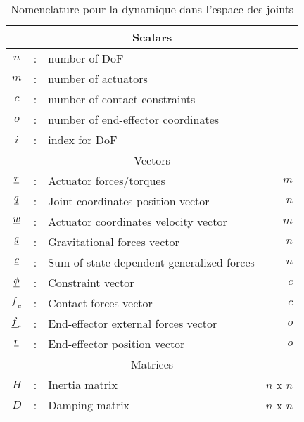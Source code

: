 \begin{table}[htbp]
	\centering
	\caption{Nomenclature pour la dynamique dans l'espace des joints}  %
	\begin{tabular}{ c c l r }
		\hline \hline
		\multicolumn{4}{c}{Scalars} \\
		\hline \hline
		$n$             &  :  & number of DoF                                              & \\
		$m$             &  :  & number of actuators                                        & \\
		$c$             &  :  & number of contact constraints                              & \\
		$o$             &  :  & number of end-effector coordinates                         & \\
		$i$             &  :  & index for DoF                                              & \\
		\hline \hline
		\multicolumn{4}{c}{Vectors} \\
		\hline \hline
		$\underline{\tau}$    &  :  & Actuator forces/torques                                    & $m$  \\
		$\underline{q}$       &  :  & Joint coordinates position vector                          & $n$  \\
		$\underline{w}$       &  :  & Actuator coordinates velocity vector                          & $m$  \\
		$\underline{g}$       &  :  & Gravitational forces vector                                & $n$  \\
		$\underline{c}$       &  :  & Sum of state-dependent generalized forces                  & $n$  \\
		$\underline{\phi}$    &  :  & Constraint vector                                          & $c$  \\
		$\underline{f}_c$     &  :  & Contact forces vector                                      & $c$  \\
		$\underline{f}_e$     &  :  & End-effector external forces vector                        & $o$  \\
		$\underline{r}$       &  :  & End-effector position vector                               & $o$  \\
		\hline \hline
		\multicolumn{4}{c}{Matrices} \\
		\hline \hline
		$H$             &  :  & Inertia matrix                                             & $n$ x $n$ \\
		$D$             &  :  & Damping matrix                                             & $n$ x $n$ \\

\end{tabular}
\end{table}

